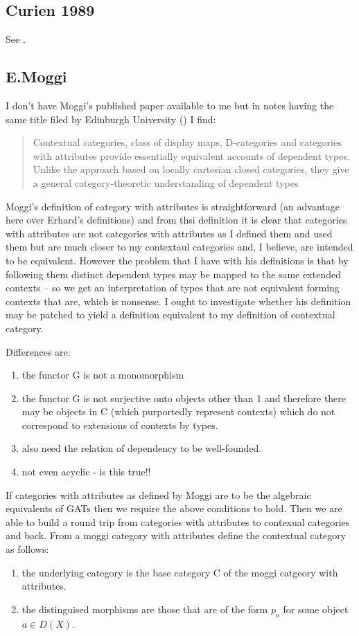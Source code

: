\documentclass[14pt,a4paper]{scrartcl}
\begin{document}
\subsection{Curien 1989}
See \cite{curien89}.

\subsection{E.Moggi} 
I don't have Moggi's published paper \cite{moggi91} available to me but in notes having the same  title filed by Edinburgh University (\cite{moggi94}) I find:
\begin{quote}
Contextual categories, class of display maps, D-categories and categories with
attributes provide essentially equivalent accounts of dependent types. Unlike
the approach based on locally cartesian closed categories, they give a general
category-theoretic understanding of dependent types
\end{quote}

Moggi's definition of category with attributes is straightforward (an advantage here over Erhard's definitions) and from thsi definition it is clear that categories with attributes are not categories with attributes as I defined them and used them but are much closer to my contextaul categories
and, I believe,  are intended to be equivalent. However the problem that I have with his definitions
is  that by following them distinct dependent types may be mapped to the same extended contexts -- so we get an interpretation of types that are not equivalent forming contexts that are,  which is nonsense.  I ought to investigate whether his definition may be patched to yield a definition equivalent to my definition of contextual category.

\noindent
Differences are:
\begin{enumerate}
\item the functor G is not a monomorphism
\item the functor G is not surjective onto objects other than 1 and therefore there may be objects in C (which purportedly represent contexts) which do not correspond to extensions of contexts by types. 
\item also need the relation of dependency to be well-founded.
\item not even acyclic - is this true!!
\end{enumerate}

\noindent
If categories with attributes as defined by Moggi are to be the algebraic equivalents of GATs then we require the above conditions to hold. Then we are able to build a round trip
 from categories with 
attributes to contexual categories and back. 
\noindent From a moggi category with attributes define the contextual category as follows:
\begin{enumerate}
\item the underlying category is the base category C of the moggi catgeory with attributes.
\item the distinguised morphisms are those that are of the form $p_a$ for some object $a \in D(X)$.
\end{enumerate}
\end{document}
